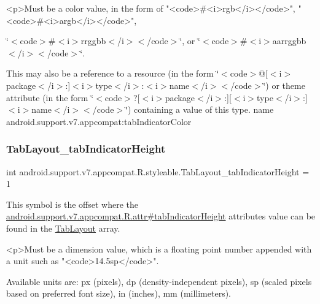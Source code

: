 \begin{DoxyVerb}      <p>Must be a color value, in the form of "<code>#<i>rgb</i></code>", "<code>#<i>argb</i></code>",
\end{DoxyVerb}
 \char`\"{}$<$code$>$\#$<$i$>$rrggbb$<$/i$>$$<$/code$>$\char`\"{}, or \char`\"{}$<$code$>$\#$<$i$>$aarrggbb$<$/i$>$$<$/code$>$\char`\"{}. 

This may also be a reference to a resource (in the form \char`\"{}$<$code$>$@\mbox{[}$<$i$>$package$<$/i$>$\+:\mbox{]}$<$i$>$type$<$/i$>$\+:$<$i$>$name$<$/i$>$$<$/code$>$\char`\"{}) or theme attribute (in the form \char`\"{}$<$code$>$?\mbox{[}$<$i$>$package$<$/i$>$\+:\mbox{]}\mbox{[}$<$i$>$type$<$/i$>$\+:\mbox{]}$<$i$>$name$<$/i$>$$<$/code$>$\char`\"{}) containing a value of this type.  name android.\+support.\+v7.\+appcompat\+:tab\+Indicator\+Color \mbox{\label{classandroid_1_1support_1_1v7_1_1appcompat_1_1R_1_1styleable_a2170d61ffaf8518ee80c93d8af20f026}} 
\subsubsection{\texorpdfstring{Tab\+Layout\+\_\+tab\+Indicator\+Height}{TabLayout\_tabIndicatorHeight}}
{\footnotesize\ttfamily int android.\+support.\+v7.\+appcompat.\+R.\+styleable.\+Tab\+Layout\+\_\+tab\+Indicator\+Height = 1\hspace{0.3cm}{\ttfamily [static]}}

This symbol is the offset where the \hyperlink{classandroid_1_1support_1_1v7_1_1appcompat_1_1R_1_1attr_a0f9821181dbe0b7ee51ea0d5d79317ba}{android.\+support.\+v7.\+appcompat.\+R.\+attr\#tab\+Indicator\+Height} attribute\textquotesingle{}s value can be found in the \hyperlink{classandroid_1_1support_1_1v7_1_1appcompat_1_1R_1_1styleable_a3c85d0c4cebbccf5b1a16ecfe13938ca}{Tab\+Layout} array.

\begin{DoxyVerb}      <p>Must be a dimension value, which is a floating point number appended with a unit such as "<code>14.5sp</code>".
\end{DoxyVerb}
 Available units are\+: px (pixels), dp (density-\/independent pixels), sp (scaled pixels based on preferred font size), in (inches), mm (millimeters). 

